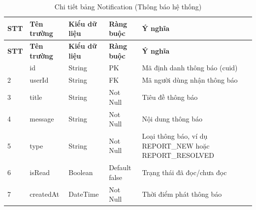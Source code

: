 \begin{longtable}{|p{0.7cm}|p{3.3cm}|p{1.9cm}|p{2.1cm}|p{5.4cm}|}
    \caption{Chi tiết bảng Notification (Thông báo hệ thống)}
    \label{tab:db_notification} \\
    \hline
    \textbf{STT} & \textbf{Tên trường} & \textbf{Kiểu dữ liệu} & \textbf{Ràng buộc} & \textbf{Ý nghĩa} \\
    \hline
    \endfirsthead
    \hline
    \textbf{STT} & \textbf{Tên trường} & \textbf{Kiểu dữ liệu} & \textbf{Ràng buộc} & \textbf{Ý nghĩa} \\
    \hline
    \endhead
    \hline
    \endfoot
    \hline
    \endlastfoot
    1 & id & String & PK & Mã định danh thông báo (cuid) \\ \hline
    2 & userId & String & FK & Mã người dùng nhận thông báo \\ \hline
    3 & title & String & Not Null & Tiêu đề thông báo \\ \hline
    4 & message & String & Not Null & Nội dung thông báo \\ \hline
    5 & type & String & Not Null & Loại thông báo, ví dụ REPORT\_NEW hoặc REPORT\_RESOLVED \\ \hline
    6 & isRead & Boolean & Default false & Trạng thái đã đọc/chưa đọc \\ \hline
    7 & createdAt & DateTime & Not Null & Thời điểm phát thông báo \\
\end{longtable}
